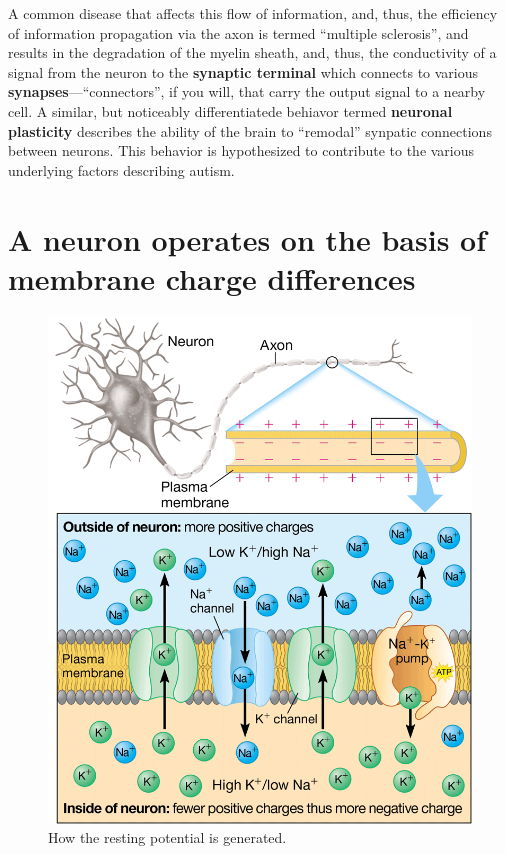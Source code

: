 \documentclass{article}
\begin{document}
A common disease that affects this flow of information, and, thus, the
efficiency of information propagation via the axon is termed ``multiple
sclerosis'', and results in the degradation of the myelin sheath, and, thus,
the conductivity of a signal from the neuron to the \textbf{synaptic terminal}
which connects to various \textbf{synapses}---``connectors'', if you will, that
carry the output signal to a nearby cell. A similar, but noticeably
differentiatede behiavor termed \textbf{neuronal plasticity} describes the ability
of the brain to ``remodal'' synpatic connections between neurons. This behavior
is hypothesized to contribute to the various underlying factors describing
autism.

\section{A neuron operates on the basis of membrane charge differences}

\begin{figure}
	\centering
	\includegraphics[width=1\linewidth]{resting_potential.png}
	\caption{How the resting potential is generated.}
\end{figure}
\end{document}

